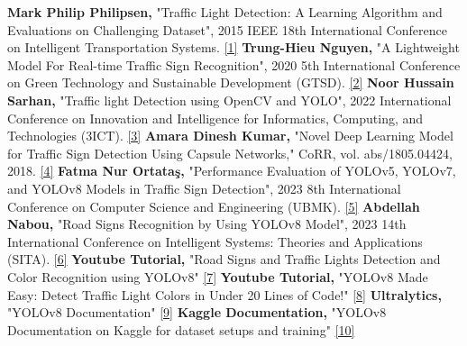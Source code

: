 \documentclass[12 pt]{report}
\begin{document}
\begin{justify}
  \textbf{Mark Philip Philipsen,} "Traffic Light Detection: A Learning Algorithm and Evaluations on Challenging Dataset", 2015 IEEE 18th International Conference on Intelligent Transportation Systems.
  \href{https://doi.org/10.1109/ITSC.2015.378}{[1]}\newline
  \textbf{Trung-Hieu Nguyen,} "A Lightweight Model For Real-time Traffic Sign Recognition", 2020 5th International Conference on Green Technology and Sustainable Development (GTSD).
  \href{https://doi.org/10.1109/GTSD50082.2020.9303072}{[2]}\newline
  \textbf{Noor Hussain Sarhan,} "Traffic light Detection using OpenCV and YOLO", 2022 International Conference on Innovation and Intelligence for Informatics, Computing, and Technologies (3ICT).
  \href{https://doi.org/10.1109/3ICT56508.2022.9990723}{[3]}\newline
  \textbf{Amara Dinesh Kumar,} "Novel Deep Learning Model for Traffic Sign Detection Using Capsule Networks," CoRR, vol. abs/1805.04424, 2018.
  \href{https://doi.org/10.48550/arXiv.1805.04424}{[4]}\newline
  \textbf{Fatma Nur Ortataş,} "Performance Evaluation of YOLOv5, YOLOv7, and YOLOv8 Models in Traffic Sign Detection", 2023 8th International Conference on Computer Science and Engineering (UBMK).
  \href{https://doi.org/10.1109/UBMK59864.2023.10286611}{[5]}\newline
  \textbf{Abdellah Nabou,} "Road Signs Recognition by Using YOLOv8 Model", 2023 14th International Conference on Intelligent Systems: Theories and Applications (SITA).
  \href{https://ieeexplore.ieee.org/document/10373723}{[6]}\newline
  \textbf{Youtube Tutorial,} "Road Signs and Traffic Lights Detection and Color Recognition using YOLOv8"
  \href{https://www.youtube.com/watch?v=-7weG-qNo0Y&t=379s&pp=ygUjdHJhZmZpYyBsaWdodCBkZXRlY3Rpb24gdXNpbmd5b2xvdjg%3D}{[7]}\newline
  \textbf{Youtube Tutorial,} "YOLOv8 Made Easy: Detect Traffic Light Colors in Under 20 Lines of Code!"
  \href{https://www.youtube.com/watch?v=A8s0HOESxv4&t=384s&pp=ygUjdHJhZmZpYyBsaWdodCBkZXRlY3Rpb24gdXNpbmd5b2xvdjg%3D}{[8]}\newline
  \textbf{Ultralytics,} "YOLOv8 Documentation" 
  \href{https://docs.ultralytics.com/models/yolov8/}{[9]}\newline
  \textbf{Kaggle Documentation,} "YOLOv8 Documentation on Kaggle for dataset setups and training" 
  \href{  https://www.kaggle.com/datasets/chenjiexu/yolov8}{[10]}
\end{justify}
\end{document}
